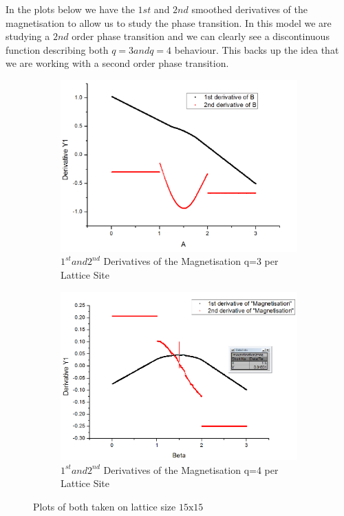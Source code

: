 \documentclass[10pt,a4paper]{article}
\begin{document}
In the plots below we have the $1st$ and $2nd$ smoothed derivatives of the magnetisation to allow us to study the phase transition.
In this model we are studying a $2nd$ order phase transition and we can clearly see a discontinuous function describing both $q=3 and q=4$ behaviour.
This backs up the idea that we are working with a second order phase transition.
\begin{figure}[H]
\centering
	\begin{subfigure}[b]{0.4\textwidth}
		\includegraphics[width=\textwidth]{q=4magnetisationderivatives.PNG}	
		\caption{$1^{st} and 2^{nd}$ Derivatives of the Magnetisation q=3 per Lattice Site}
	\end{subfigure}
	\begin{subfigure}[b]{0.4\textwidth}
		\includegraphics[width=\textwidth]{q=3magnetisationderivatives.PNG}
		\caption{$1^{st} and 2^{nd}$ Derivatives of the Magnetisation q=4 per Lattice Site}
	\end{subfigure}
\caption{Plots of both taken on lattice size $15 \textrm{x} 15$}
\end{figure}
\end{document}
